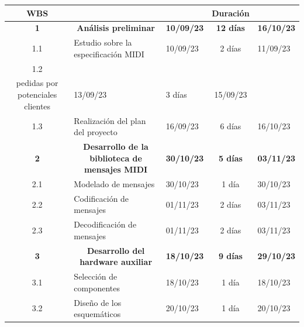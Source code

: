 \documentclass[
11pt, %
]{charter}
\begin{document}
\begin{longtable}[c]{|cllcl|}
	\hline
	\rowcolor[HTML]{C0C0C0} 
	{\color[HTML]{000000} \textbf{WBS}} & \multicolumn{1}{c}{\cellcolor[HTML]{C0C0C0}{\color[HTML]{000000} \textbf{Nombre}}} & \multicolumn{1}{c}{\cellcolor[HTML]{C0C0C0}{\color[HTML]{000000} \textbf{Inicio}}} & {\color[HTML]{000000} \textbf{Duración}} & \multicolumn{1}{c|}{\cellcolor[HTML]{C0C0C0}{\color[HTML]{000000} \textbf{Fin}}} \\ \hline
	\endhead
	\hline
	\endfoot
	\endlastfoot
	\rowcolor[HTML]{ECF4FF} 
	\textbf{1} & \multicolumn{1}{c}{\cellcolor[HTML]{ECF4FF}\textbf{Análisis preliminar}} & \textbf{10/09/23} & \textbf{12 días} & \textbf{16/10/23} \\
	1.1 & Estudio sobre la especificación MIDI & 10/09/23 & 2 días & 11/09/23 \\
	\rowcolor[HTML]{EFEFEF} 
	1.2 & \begin{tabular}[c]{@{}l@{}}Investigación sobre features\\ pedidas por potenciales clientes\end{tabular} & 13/09/23 & 3 días & 15/09/23 \\
	1.3 & Realización del plan del proyecto & 16/09/23 & 6 días & 16/10/23 \\
	\rowcolor[HTML]{ECF4FF} 
	\textbf{2} & \multicolumn{1}{c}{\cellcolor[HTML]{ECF4FF}\textbf{Desarrollo de la biblioteca de mensajes MIDI}} & \textbf{30/10/23} & \textbf{5 días} & \textbf{03/11/23} \\
	2.1 & Modelado de mensajes & 30/10/23 & 1 día & 30/10/23 \\
	\rowcolor[HTML]{EFEFEF} 
	2.2 & Codificación de mensajes & 01/11/23 & 2 días & 03/11/23 \\
	2.3 & Decodificación de mensajes & 01/11/23 & 2 días & 03/11/23 \\
	\rowcolor[HTML]{ECF4FF} 
	\textbf{3} & \multicolumn{1}{c}{\cellcolor[HTML]{ECF4FF}\textbf{Desarrollo del hardware auxiliar}} & \textbf{18/10/23} & \textbf{9 días} & \textbf{29/10/23} \\
	3.1 & Selección de componentes & 18/10/23 & 1 día & 18/10/23 \\
	\rowcolor[HTML]{EFEFEF} 
	3.2 & Diseño de los esquemáticos & 20/10/23 & 1 día & 20/10/23 \\

\end{longtable}
\end{document}
